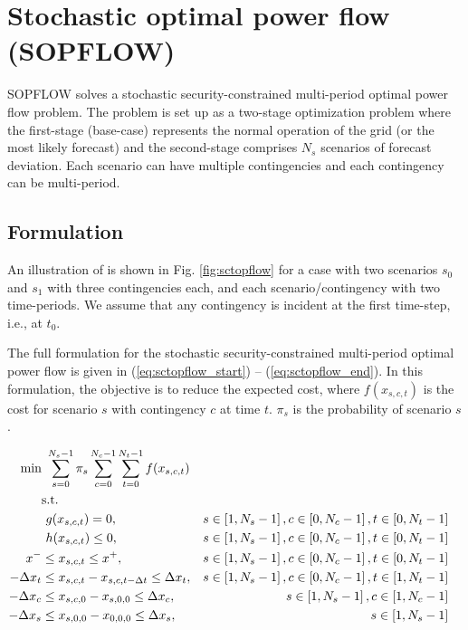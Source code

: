 \chapter{Stochastic optimal power flow (SOPFLOW)}\label{chap:sopflow}
SOPFLOW solves a stochastic security-constrained multi-period optimal power flow problem. The problem is set up as a two-stage optimization problem where the first-stage (base-case) represents the normal operation of the grid (or the most likely forecast) and the second-stage comprises $N_s$ scenarios of forecast deviation. Each scenario can have multiple contingencies and each contingency can be multi-period.

\section{Formulation}
An illustration of \sopflow is shown in Fig. \ref{fig:sctopflow} for a case with two scenarios $s_0$ and $s_1$ with three contingencies each, and each scenario/contingency with two time-periods. We assume that any contingency is incident at the first time-step, i.e., at $t_0$.



The full formulation for the stochastic security-constrained multi-period optimal power flow is given in (\ref{eq:sctopflow_start}) -- (\ref{eq:sctopflow_end}). In this formulation, the objective is to reduce the expected cost, where $f(x_{s,c,t})$ is the cost for scenario $s$ with contingency $c$ at time $t$. $\pi_s$ is the probability of scenario $s$.

\begin{align}
\centering
\text{min}&~\sum_{s=0}^{N_s-1}\pi_s\sum_{c=0}^{N_c-1}\sum_{t=0}^{N_t-1}f(x_{s,c,t})&  \label{eq:sctopflow_start}\\
&\text{s.t.}& \nonumber \\
&~g(x_{s,c,t}) = 0,                                        &s \in \left[1,N_s-1\right],c \in \left[0,N_c-1\right], t \in \left[0,N_t-1\right]& \\
&~h(x_{s,c,t}) \le 0,                                      &s \in \left[1,N_s-1\right],c \in \left[0,N_c-1\right], t \in \left[0,N_t-1\right]& \\
x^- & \le x_{s,c,t} \le x^+,                               &s \in \left[1,N_s-1\right],c \in \left[0,N_c-1\right], t\in \left[0,N_t-1\right]& \\
-\Delta x_t & \le x_{s,c,t} - x_{s,c,t-\Delta{t}} \le \Delta x_t,&s \in \left[1,N_s-1\right],c \in \left[0,N_c-1\right], t \in \left[1,N_t-1\right]& \label{eq:sctopflow_time_coupling}\\
-\Delta x_c & \le x_{s,c,0} - x_{s,0,0} \le \Delta x_c,&s \in \left[1,N_s-1\right],c \in \left[1,N_c-1\right]&
\label{eq:sctopflow_contingency_coupling} \\
-\Delta x_s & \le x_{s,0,0} - x_{0,0,0} \le \Delta x_s,&s \in \left[1,N_s-1\right]&
\label{eq:sctopflow_end}
\end{align}

